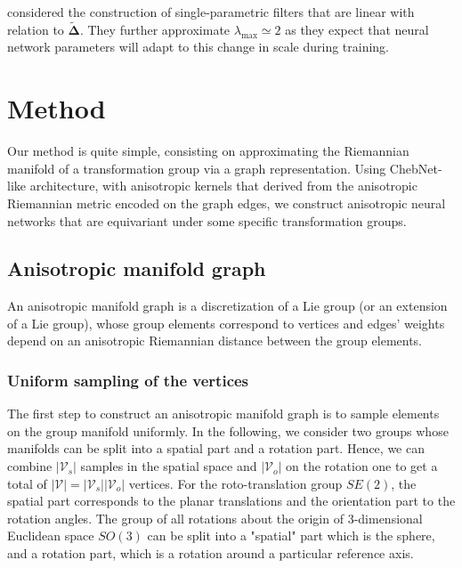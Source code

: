\documentclass{article}
\begin{document}
\citet{kipf2016gcn} considered the construction of single-parametric filters that are linear with relation to $\boldsymbol{\tilde{\Delta}}$. They further approximate $\lambda_{\max} \simeq 2$ as they expect that neural network parameters will adapt to this change in scale during training.

\section{Method} \label{sec:method}

Our method is quite simple, consisting on approximating the Riemannian manifold of a transformation group via a graph representation. Using ChebNet-like architecture, with anisotropic kernels that derived from the anisotropic Riemannian metric encoded on the graph edges, we construct anisotropic neural networks that are equivariant under some specific transformation groups.

\subsection{Anisotropic manifold graph}

An anisotropic manifold graph is a discretization of a Lie group (or an extension of a Lie group), whose group elements correspond to vertices and edges' weights depend on an anisotropic Riemannian distance between the group elements. 

\subsubsection{Uniform sampling of the vertices}

The first step to construct an anisotropic manifold graph is to sample elements on the group manifold uniformly. In the following, we consider two groups whose manifolds can be split into a spatial part and a rotation part. Hence, we can combine $|\mathcal{V}_s|$ samples in the spatial space and $|\mathcal{V}_o|$ on the rotation one to get a total of $|\mathcal{V}| = |\mathcal{V}_s| |\mathcal{V}_o|$ vertices. For the roto-translation group  $SE(2)$, the spatial part corresponds to the planar translations and the orientation part to the rotation angles. The group of all rotations about the origin of 3-dimensional Euclidean space $SO(3)$ can be split into a "spatial" part which is the sphere, and a rotation part, which is a rotation around a particular reference axis.
\end{document}
